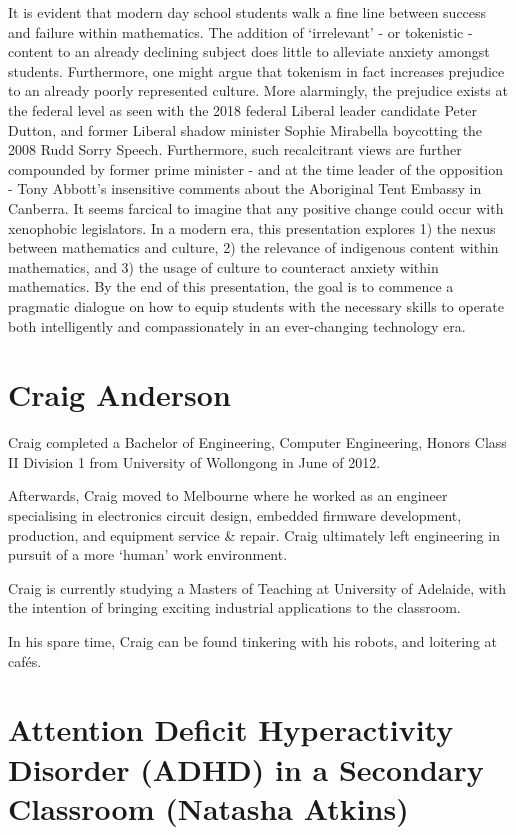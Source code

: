 \documentclass[twoside,12pt,a4paper,notitlepage]{memoir}
\begin{document}
It is evident that modern day school students walk a fine line between success and failure within mathematics. The addition of ‘irrelevant’ - or tokenistic - content to an already declining subject does little to alleviate anxiety amongst students. Furthermore, one might argue that tokenism in fact increases prejudice to an already poorly represented culture.
More alarmingly, the prejudice exists at the federal level as seen with the 2018 federal Liberal leader candidate Peter Dutton, and former Liberal shadow minister Sophie Mirabella boycotting the 2008 Rudd Sorry Speech. Furthermore, such recalcitrant views are further compounded by former prime minister - and at the time leader of the opposition - Tony Abbott’s insensitive comments about the Aboriginal Tent Embassy in Canberra. It seems farcical to imagine that any positive change could occur with xenophobic legislators.
In a modern era, this presentation explores 1) the nexus between mathematics and culture, 2) the relevance of indigenous content within mathematics, and 3) the usage of culture to counteract anxiety within mathematics. By the end of this presentation, the goal is to commence a pragmatic dialogue on how to equip students with the necessary skills to operate both intelligently and compassionately in an ever-changing technology era.

\section*{Craig Anderson}

Craig completed a Bachelor of Engineering, Computer Engineering, Honors Class II Division 1 from University of Wollongong in June of 2012.

Afterwards, Craig moved to Melbourne where he worked as an engineer specialising in electronics circuit design, embedded firmware development, production, and equipment service \& repair. Craig ultimately left engineering in pursuit of a more ‘human’ work environment.

Craig is currently studying a Masters of Teaching at University of Adelaide, with the intention of bringing exciting industrial applications to the classroom.

In his spare time, Craig can be found tinkering with his robots, and loitering at cafés.



\pagebreak
\section*{Attention Deficit Hyperactivity Disorder (ADHD) in a Secondary Classroom (Natasha Atkins)}
\label{aut:atkins}
\end{document}
